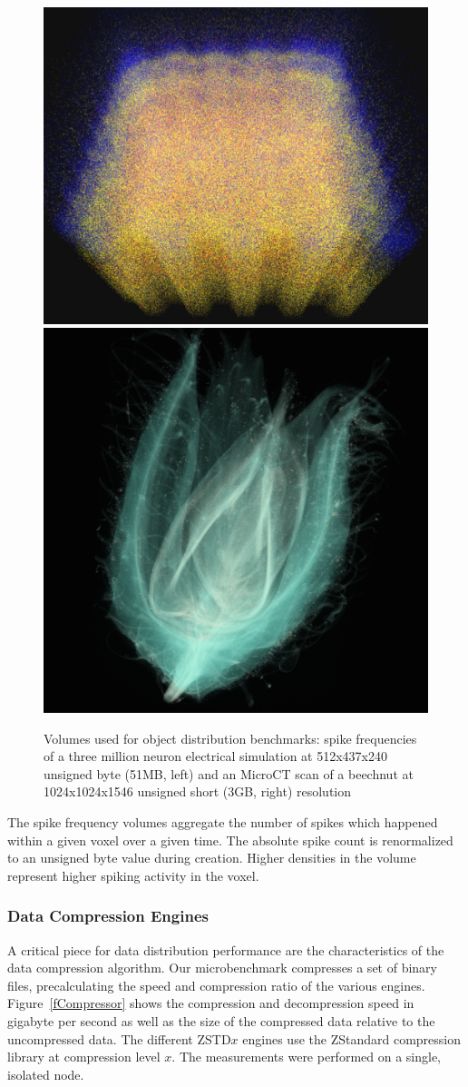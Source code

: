 \documentclass[10pt,journal,compsoc]{IEEEtran}
\newcommand{\fig}[1]{Figure~\ref{#1}}
\begin{document}
\begin{figure}[ht]\center
  \includegraphics[height=.44\columnwidth]{images/spikes512}\hfil
  \includegraphics[height=.44\columnwidth]{images/beechnut}
  \caption{\label{fVolumes}Volumes used for object distribution benchmarks:
    spike frequencies of a three million neuron electrical simulation at
    512x437x240 unsigned byte (51MB, left) and an MicroCT scan of a beechnut at
    1024x1024x1546 unsigned short (3GB, right) resolution}
\end{figure}

The spike frequency volumes aggregate the number of spikes which happened within
a given voxel over a given time. The absolute spike count is renormalized to an
unsigned byte value during creation. Higher densities in the volume represent
higher spiking activity in the voxel.

\subsubsection{Data Compression Engines}

A critical piece for data distribution performance are the characteristics of
the data compression algorithm. Our microbenchmark compresses a set of binary
files, precalculating the speed and compression ratio of the various engines.
\fig{fCompressor} shows the compression and decompression speed in gigabyte per
second as well as the size of the compressed data relative to the uncompressed
data. The different ZSTD$x$ engines use the ZStandard compression library at
compression level $x$. The measurements were performed on a single, isolated
node.
\end{document}
